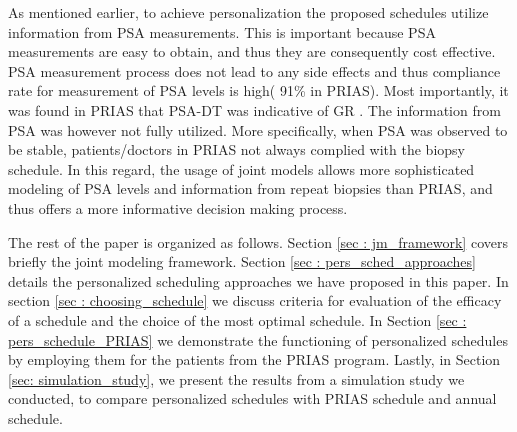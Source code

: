 As mentioned earlier, to achieve personalization the proposed schedules utilize information from PSA measurements. This is important because PSA measurements are easy to obtain, and thus they are consequently cost effective. PSA measurement process does not lead to any side effects and thus compliance rate for measurement of PSA levels is high( 91\% in PRIAS). Most importantly, it was found in PRIAS that PSA-DT was indicative of GR \citep{bokhorst2015compliance}. The information from PSA was however not fully utilized. More specifically, when PSA was observed to be stable, patients/doctors in PRIAS not always complied with the biopsy schedule. In this regard, the usage of joint models allows more sophisticated modeling of PSA levels and information from repeat biopsies than PRIAS, and thus offers a more informative decision making process.

The rest of the paper is organized as follows. Section \ref{sec : jm_framework} covers briefly the joint modeling framework. Section \ref{sec : pers_sched_approaches} details the personalized scheduling approaches we have proposed in this paper. In section \ref{sec : choosing_schedule} we discuss criteria for evaluation of the efficacy of a schedule and the choice of the most optimal schedule. In Section \ref{sec : pers_schedule_PRIAS} we demonstrate the functioning of personalized schedules by employing them for the patients from the PRIAS program. Lastly, in Section \ref{sec: simulation_study}, we present the results from a simulation study we conducted, to compare personalized schedules with PRIAS schedule and annual schedule.
